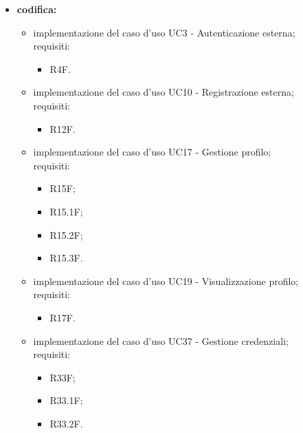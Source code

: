 \begin{itemize}
    \item \textbf{codifica:}
          \begin{itemize}
              \item implementazione del caso d'uso UC3 - Autenticazione esterna;\\
                    requisiti:
                    \begin{itemize}
                        \item R4F.
                    \end{itemize}
              \item implementazione del caso d'uso UC10 - Registrazione esterna;\\
                    requisiti:
                    \begin{itemize}
                        \item R12F.
                    \end{itemize}
              \item implementazione del caso d'uso UC17 - Gestione profilo;\\
                    requisiti:
                    \begin{itemize}
                        \item R15F;
                        \item R15.1F;
                        \item R15.2F;
                        \item R15.3F.
                    \end{itemize}
              \item implementazione del caso d'uso UC19 - Visualizzazione profilo;\\
                    requisiti:
                    \begin{itemize}
                        \item R17F.
                    \end{itemize}
              \item implementazione del caso d'uso UC37 - Gestione credenziali;\\
                    requisiti:
                    \begin{itemize}
                        \item R33F;
                        \item R33.1F;
                        \item R33.2F.

\end{itemize}
\end{itemize}
\end{itemize}
